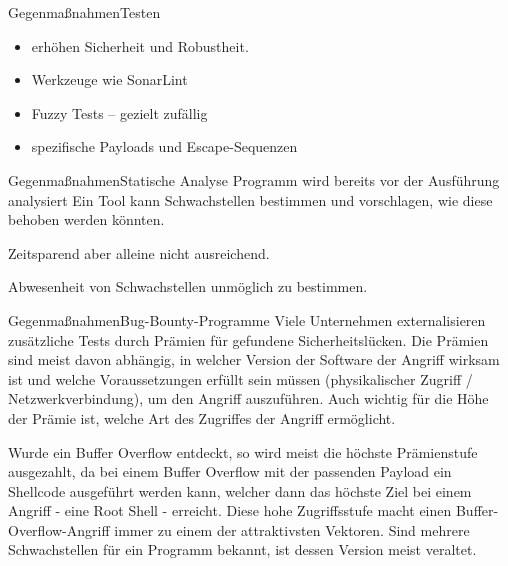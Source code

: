 \begin{frame}{Gegenmaßnahmen}{Testen}
    \begin{itemize}
        \item erhöhen Sicherheit und Robustheit. 
        \item Werkzeuge wie SonarLint%
        \item Fuzzy Tests -- gezielt zufällig
        \item spezifische Payloads und Escape-Sequenzen
    \end{itemize}    
\end{frame}


\begin{frame}{Gegenmaßnahmen}{Statische Analyse}
    Programm wird bereits vor der Ausführung analysiert 
    Ein Tool kann Schwachstellen bestimmen und
    vorschlagen, wie diese behoben werden könnten.
    
    Zeitsparend aber alleine nicht ausreichend.
    
    Abwesenheit von Schwachstellen unmöglich zu bestimmen.
\end{frame}


\begin{frame}{Gegenmaßnahmen}{Bug-Bounty-Programme} 
    Viele Unternehmen externalisieren zusätzliche Tests durch Prämien für gefundene Sicherheitslücken.
    Die Prämien sind meist davon abhängig, in welcher Version der Software der Angriff 
    wirksam ist und welche Voraussetzungen erfüllt sein müssen (physikalischer Zugriff / Netzwerkverbindung),
    um den Angriff auszuführen. Auch wichtig für die Höhe der Prämie ist, welche Art des Zugriffes
    der Angriff ermöglicht.
    
    Wurde ein Buffer Overflow entdeckt, so wird meist die höchste Prämienstufe ausgezahlt, da bei einem
    Buffer Overflow mit der passenden Payload ein Shellcode ausgeführt werden kann, welcher dann das
    höchste Ziel bei einem Angriff - eine Root Shell - erreicht.
    Diese hohe Zugriffsstufe macht einen Buffer-Overflow-Angriff immer zu einem der attraktivsten Vektoren. 
    Sind mehrere Schwachstellen für ein Programm bekannt, ist dessen Version meist veraltet. 
    
    
\end{frame}


